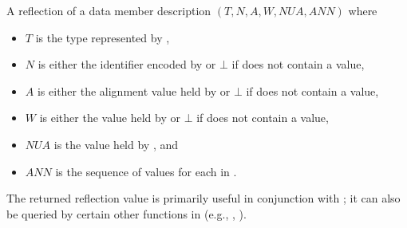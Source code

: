 \begin{itemdescr}
\pnum
\returns
A reflection of a data member description
$(T, N, A, W, \mathit{NUA}, \mathit{ANN})$ where
\begin{itemize}
\item
  $T$ is the type represented by ,
\item
  $N$ is either the identifier encoded by 
  or $\bot$ if  does not contain a value,
\item
  $A$ is either the alignment value held by 
  or $\bot$ if  does not contain a value,
\item
  $W$ is either the value held by 
  or $\bot$ if  does not contain a value,
\item
  $\mathit{NUA}$ is the value held by , and
\item
  $\mathit{ANN}$ is the sequence of values 
  for each  in .
\end{itemize}
\begin{note}
The returned reflection value is primarily useful
in conjunction with ;
it can also be queried by certain other functions in 
(e.g., , ).
\end{note}


\end{itemdescr}
